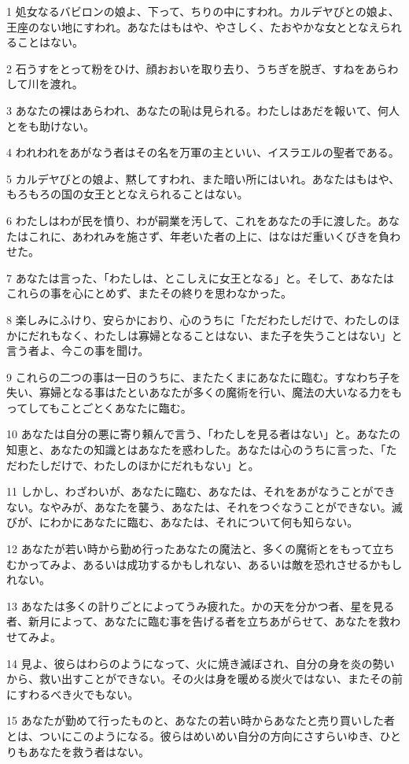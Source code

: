 \par 1 処女なるバビロンの娘よ、下って、ちりの中にすわれ。カルデヤびとの娘よ、王座のない地にすわれ。あなたはもはや、やさしく、たおやかな女ととなえられることはない。
\par 2 石うすをとって粉をひけ、顔おおいを取り去り、うちぎを脱ぎ、すねをあらわして川を渡れ。
\par 3 あなたの裸はあらわれ、あなたの恥は見られる。わたしはあだを報いて、何人とをも助けない。
\par 4 われわれをあがなう者はその名を万軍の主といい、イスラエルの聖者である。
\par 5 カルデヤびとの娘よ、黙してすわれ、また暗い所にはいれ。あなたはもはや、もろもろの国の女王ととなえられることはない。
\par 6 わたしはわが民を憤り、わが嗣業を汚して、これをあなたの手に渡した。あなたはこれに、あわれみを施さず、年老いた者の上に、はなはだ重いくびきを負わせた。
\par 7 あなたは言った、「わたしは、とこしえに女王となる」と。そして、あなたはこれらの事を心にとめず、またその終りを思わなかった。
\par 8 楽しみにふけり、安らかにおり、心のうちに「ただわたしだけで、わたしのほかにだれもなく、わたしは寡婦となることはない、また子を失うことはない」と言う者よ、今この事を聞け。
\par 9 これらの二つの事は一日のうちに、またたくまにあなたに臨む。すなわち子を失い、寡婦となる事はたといあなたが多くの魔術を行い、魔法の大いなる力をもってしてもことごとくあなたに臨む。
\par 10 あなたは自分の悪に寄り頼んで言う、「わたしを見る者はない」と。あなたの知恵と、あなたの知識とはあなたを惑わした。あなたは心のうちに言った、「ただわたしだけで、わたしのほかにだれもない」と。
\par 11 しかし、わざわいが、あなたに臨む、あなたは、それをあがなうことができない。なやみが、あなたを襲う、あなたは、それをつぐなうことができない。滅びが、にわかにあなたに臨む、あなたは、それについて何も知らない。
\par 12 あなたが若い時から勤め行ったあなたの魔法と、多くの魔術とをもって立ちむかってみよ、あるいは成功するかもしれない、あるいは敵を恐れさせるかもしれない。
\par 13 あなたは多くの計りごとによってうみ疲れた。かの天を分かつ者、星を見る者、新月によって、あなたに臨む事を告げる者を立ちあがらせて、あなたを救わせてみよ。
\par 14 見よ、彼らはわらのようになって、火に焼き滅ぼされ、自分の身を炎の勢いから、救い出すことができない。その火は身を暖める炭火ではない、またその前にすわるべき火でもない。
\par 15 あなたが勤めて行ったものと、あなたの若い時からあなたと売り買いした者とは、ついにこのようになる。彼らはめいめい自分の方向にさすらいゆき、ひとりもあなたを救う者はない。

